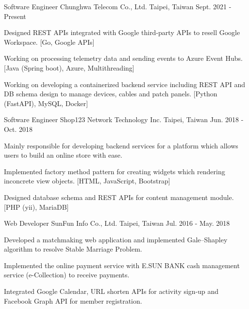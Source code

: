 

\begin{cventries}

  \cventry
    {Software Engineer} %
    {Chunghwa Telecom Co., Ltd.} %
    {Taipei, Taiwan} %
    {Sept. 2021 - Present} %
    {
      \begin{cvitems} %
      \item {Designed REST APIs integrated with Google third-party APIs to resell Google Workspace. [Go, Google APIs]}
      \item {Working on processing telemetry data and sending events to Azure Event Hubs. [Java (Spring boot), Azure, Multithreading]}
      \item {Working on developing a containerized backend service including REST API and DB schema design to manage devices, cables and patch panels. [Python (FastAPI), MySQL, Docker]}
      \end{cvitems}
    }
  \cventry
    {Software Engineer} %
    {Shop123 Network Technology Inc.} %
    {Taipei, Taiwan} %
    {Jun. 2018 - Oct. 2018} %
    {
      \begin{cvitems} %
        \item {Mainly responsible for developing backend services for a platform which allows users to build an online store with ease.}
	\item {Implemented factory method pattern for creating widgets which rendering inconcrete view objects. [HTML, JavaScript, Bootstrap]}
	\item {Designed database schema and REST APIs for content management module. [PHP (yii), MariaDB]}
      \end{cvitems}
    }

  \cventry
    {Web Developer} %
    {SunFun Info Co., Ltd.} %
    {Taipei, Taiwan} %
    {Jul. 2016 - May. 2018} %
    {
      \begin{cvitems} %
        \item {Developed a matchmaking web application and implemented Gale–Shapley algorithm to resolve Stable Marriage Problem.}
        \item {Implemented the online payment service with E.SUN BANK cash management service (e-Collection) to receive payments.}
	\item {Integrated Google Calendar, URL shorten APIs for activity sign-up and Facebook Graph API for member registration.}
      \end{cvitems}
    }

\end{cventries}
